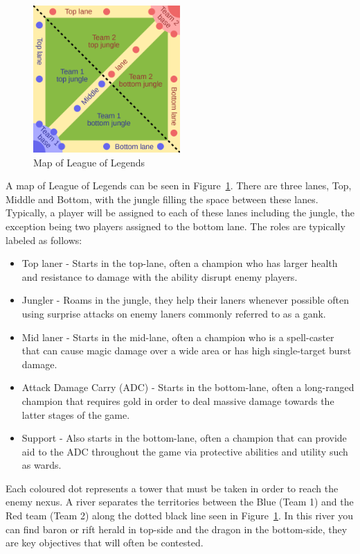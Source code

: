 \begin{figure}[h!]
    \centering
    \includegraphics[width=0.5\textwidth]{figures/MOBAMap}
    \caption{Map of League of Legends}
    \label{fig:Lolmap}
\end{figure}

A map of League of Legends can be seen in Figure~\ref{fig:Lolmap}.
There are three lanes, Top, Middle and Bottom, with the \gls{jungle} filling the space between these lanes.
Typically, a player will be assigned to each of these lanes including the jungle, the exception being two players assigned to the bottom lane.
The roles are typically labeled as follows:
\begin{itemize}
    \item Top laner - Starts in the top-lane, often a champion who has larger health and resistance to damage with the ability disrupt enemy players.
    \item Jungler - Roams in the jungle, they help their laners whenever possible often using surprise attacks on enemy laners commonly referred to as a \gls{gank}.
    \item Mid laner - Starts in the mid-lane, often a champion who is a spell-caster that can cause magic damage over a wide area or has high single-target burst damage.
    \item Attack Damage Carry (ADC) - Starts in the bottom-lane, often a long-ranged champion that requires gold in order to deal massive damage towards the latter stages of the game.
    \item Support - Also starts in the bottom-lane, often a champion that can provide aid to the ADC throughout the game via protective abilities and utility such as \glspl{ward}.
\end{itemize}
Each coloured dot represents a \gls{tower} that must be taken in order to reach the enemy \Gls{nexus}.
A river separates the territories between the Blue (Team 1) and the Red team (Team 2) along the dotted black line seen in Figure~\ref{fig:Lolmap}.
In this river you can find \Gls{baron} or \Gls{rift herald} in top-side and the \Gls{dragon} in the bottom-side, they are key objectives that will often be contested.

